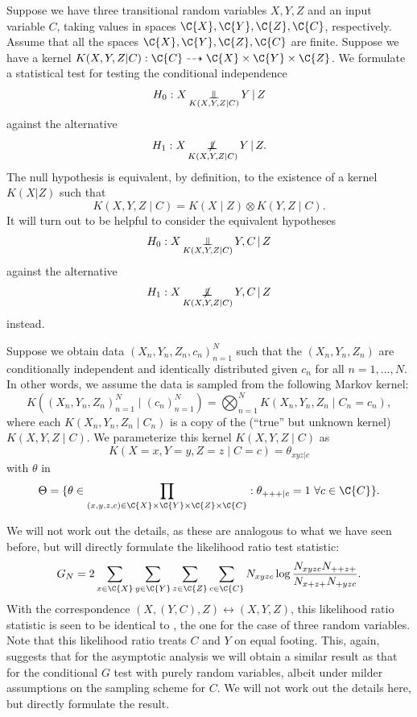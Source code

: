 Suppose we have three transitional random variables $X,Y,Z$ and an input variable $C$,
taking values in spaces $\C{X}, \C{Y}, \C{Z}, \C{C}$, respectively. 
Assume that all the spaces $\C{X},\C{Y},\C{Z},\C{C}$ are finite.
Suppose we have a kernel $K(X,Y,Z|C) : \C{C} \dshto \C{X} \times \C{Y} \times \C{Z}$.
We formulate a statistical test for testing the conditional independence
$$H_0 : X \operatorname*{\perp\mkern-11mu\perp}_{K(X,Y,Z|C)} Y \operatorname*{|} Z$$
against the alternative
$$H_1 : X \operatorname*{\not\mkern-2mu\perp\mkern-11mu\perp}_{K(X,Y,Z|C)} Y \operatorname*{|} Z.$$
The null hypothesis is equivalent, by definition, to the existence of a kernel $K(X|Z)$ such that
$$K(X,Y,Z \mid C) = K(X \mid Z) \otimes K(Y,Z \mid C).$$
It will turn out to be helpful to consider the equivalent hypotheses
$$H_0 : X \operatorname*{\perp\mkern-11mu\perp}_{K(X,Y,Z|C)} Y,C \operatorname*{|} Z$$
against the alternative
$$H_1 : X \operatorname*{\not\mkern-2mu\perp\mkern-11mu\perp}_{K(X,Y,Z|C)} Y,C \operatorname*{|} Z$$
instead.

Suppose we obtain data $(X_n,Y_n,Z_n,c_n)_{n=1}^N$ such that the
$(X_n,Y_n,Z_n)$ are conditionally independent and identically distributed given $c_n$ for all $n=1,\dots,N$.
In other words, we assume the data is sampled from the following Markov kernel:
$$K((X_n,Y_n,Z_n)_{n=1}^N \mid (c_n)_{n=1}^N) = \bigotimes_{n=1}^N K(X_n,Y_n,Z_n \mid C_n=c_n),$$
where each $K(X_n,Y_n,Z_n \mid C_n)$ is a copy of the (``true'' but unknown kernel) $K(X,Y,Z \mid C)$.
We parameterize this kernel $K(X,Y,Z \mid C)$ as
$$K(X=x,Y=y,Z=z \mid C=c) = \theta_{xyz|c}$$
with $\theta$ in 
$$\Theta = \{ \theta \in \prod_{(x,y,z,c) \in \C{X}\times\C{Y}\times\C{Z}\times\C{C}} : \theta_{+++|c} = 1 \ \forall c\in\C{C} \}.$$

We will not work out the details, as these are analogous to what we have seen before, but will directly formulate
the likelihood ratio test statistic:
\begin{equation}\label{eq:general_G_test_statistic}
  G_N = 2 \sum_{x\in\C{X}}\sum_{y\in\C{Y}}\sum_{z\in\C{Z}}\sum_{c\in\C{C}}
  N_{xyzc} \log \frac{N_{xyzc} N_{++z+}}{N_{x+z+} N_{+yzc}}.
\end{equation}
With the correspondence $(X,(Y,C),Z) \leftrightarrow (X,Y,Z)$, this likelihood
ratio statistic is seen to be identical to , the one for the case
of three random variables. Note that this likelihood ratio treats $C$ and $Y$ on equal footing. 
This, again, suggests that for the asymptotic analysis we will obtain
a similar result as that for the conditional $G$ test with purely random variables, albeit under milder
assumptions on the sampling scheme for $C$. We will not work out the details here, but directly
formulate the result.

